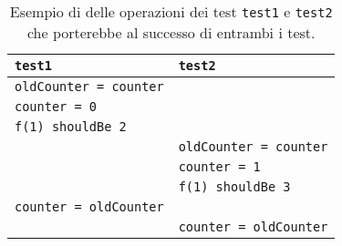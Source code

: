 \begin{table}[!ht]
  \centering
  \begin{tabular}{ll}
    \toprule
    \lstinline|test1|                & \lstinline|test2|                \\
    \midrule
    \lstinline|oldCounter = counter| &                                  \\
    \lstinline|counter = 0|          &                                  \\
    \lstinline|f(1) shouldBe 2|      &                                  \\
                                     & \lstinline|oldCounter = counter| \\
                                     & \lstinline|counter = 1|          \\
                                     & \lstinline|f(1) shouldBe 3|      \\
    \lstinline|counter = oldCounter| &                                  \\
                                     & \lstinline|counter = oldCounter| \\
    \bottomrule
  \end{tabular}
  \caption{Esempio di  delle operazioni dei test \lstinline|test1| e \lstinline|test2| che porterebbe al successo di entrambi i test.}
  \label{table:test-f-interleaving-success}
\end{table}